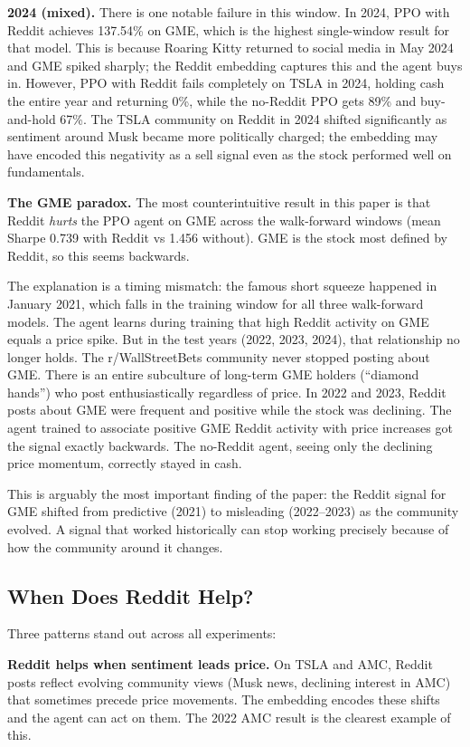\documentclass[letterpaper,twocolumn]{article}
\begin{document}
\textbf{2024 (mixed).} There is one notable failure in this window.
In 2024, PPO with Reddit achieves 137.54\% on GME, which is
the highest single-window result for that model.
This is because Roaring Kitty returned to social media in
May 2024 and GME spiked sharply; the Reddit embedding
captures this and the agent buys in.
However, PPO with Reddit fails completely on TSLA in 2024,
holding cash the entire year and returning 0\%, while the
no-Reddit PPO gets 89\% and buy-and-hold 67\%.
The TSLA community on Reddit in 2024 shifted significantly
as sentiment around Musk became more politically charged;
the embedding may have encoded this negativity as a sell
signal even as the stock performed well on fundamentals.

\textbf{The GME paradox.}
The most counterintuitive result in this paper is that Reddit
\emph{hurts} the PPO agent on GME across the walk-forward
windows (mean Sharpe 0.739 with Reddit vs 1.456 without).
GME is the stock most defined by Reddit, so this seems
backwards.

The explanation is a timing mismatch: the famous short squeeze
happened in January 2021, which falls in the training window
for all three walk-forward models.
The agent learns during training that high Reddit activity on
GME equals a price spike.
But in the test years (2022, 2023, 2024), that relationship
no longer holds.
The r/WallStreetBets community never stopped posting about
GME. There is an entire subculture of long-term GME holders
(``diamond hands'') who post enthusiastically regardless of
price.
In 2022 and 2023, Reddit posts about GME were frequent and
positive while the stock was declining.
The agent trained to associate positive GME Reddit activity
with price increases got the signal exactly backwards.
The no-Reddit agent, seeing only the declining price
momentum, correctly stayed in cash.

This is arguably the most important finding of the paper:
the Reddit signal for GME shifted from predictive (2021) to
misleading (2022--2023) as the community evolved.
A signal that worked historically can stop working precisely
because of how the community around it changes.

\subsection{When Does Reddit Help?}

Three patterns stand out across all experiments:

\textbf{Reddit helps when sentiment leads price.}
On TSLA and AMC, Reddit posts reflect evolving community views
(Musk news, declining interest in AMC) that sometimes precede
price movements.
The embedding encodes these shifts and the agent can act on
them.
The 2022 AMC result is the clearest example of this.
\end{document}
